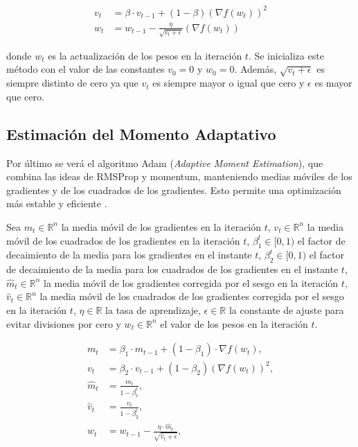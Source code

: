 \begin{align}
    v_t &= \beta \cdot v_{t-1}+ (1-\beta) (\nabla f(w_t))^2 \\
    w_t &= w_{t-1} - \frac{\eta}{\sqrt{v_t + \epsilon}} (\nabla f(w_t))
\end{align}

donde $w_t$ es la actualización de los pesos en la iteración $t$. Se inicializa este método con el valor de las constantes $v_0 = 0$ y $w_0 = 0$. Además, $\sqrt{v_t + \epsilon}$ es siempre distinto de cero ya que $v_t$ es siempre mayor o igual que cero y $\epsilon$ es mayor que cero.




\subsection{Estimación del Momento Adaptativo}

Por último se verá el algoritmo Adam (\textit{Adaptive Moment Estimation}), que combina las ideas de RMSProp y momentum, manteniendo medias móviles de los gradientes y de los cuadrados de los gradientes. Esto permite una optimización más estable y eficiente \citep{pajares2021aprendizaje}. 

Sea \( m_t \in \mathbb{R}^n \) la media móvil de los gradientes en la iteración \( t \), \( v_t \in \mathbb{R}^n \) la media móvil de los cuadrados de los gradientes en la iteración \( t \), \( \beta_1^t \in [0, 1) \) el factor de decaimiento de la media para los gradientes en el instante $t$, \( \beta_2^t \in [0, 1) \) el factor de decaimiento de la media para los cuadrados de los gradientes en el instante $t$, \( \hat{m}_t \in \mathbb{R}^n \) la media móvil de los gradientes corregida por el sesgo en la iteración \( t \), \( \hat{v}_t \in \mathbb{R}^n \) la media móvil de los cuadrados de los gradientes corregida por el sesgo en la iteración \( t \), \( \eta \in \mathbb{R} \) la tasa de aprendizaje, \( \epsilon \in \mathbb{R} \) la constante de ajuste para evitar divisiones por cero y \( w_t \in \mathbb{R}^n \) el valor de los pesos en la iteración \( t \).

\begin{align}
    m_t &= \beta_1 \cdot m_{t-1} + (1 - \beta_1) \cdot \nabla f(w_t), \\
    v_t &= \beta_2 \cdot v_{t-1} + (1 - \beta_2) (\nabla f(w_t))^2, \\
    \hat{m}_t &= \frac{m_t}{1 - \beta_1^t}, \\
    \hat{v}_t &= \frac{v_t}{1 - \beta_2^t}, \\
    w_t &= w_{t-1} - \frac{\eta \cdot \hat{m}_t}{\sqrt{\hat{v}_t + \epsilon}},
\end{align}

